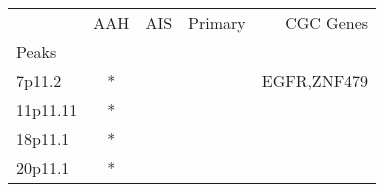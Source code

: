 \begin{tabular}{lcccr}
\toprule
{} & AAH & AIS & Primary &    CGC Genes \\
Peaks    &     &     &         &              \\
\midrule
7p11.2   &   * &     &         &  EGFR,ZNF479 \\
11p11.11 &   * &     &         &              \\
18p11.1  &   * &     &         &              \\
20p11.1  &   * &     &         &              \\
\bottomrule
\end{tabular}
